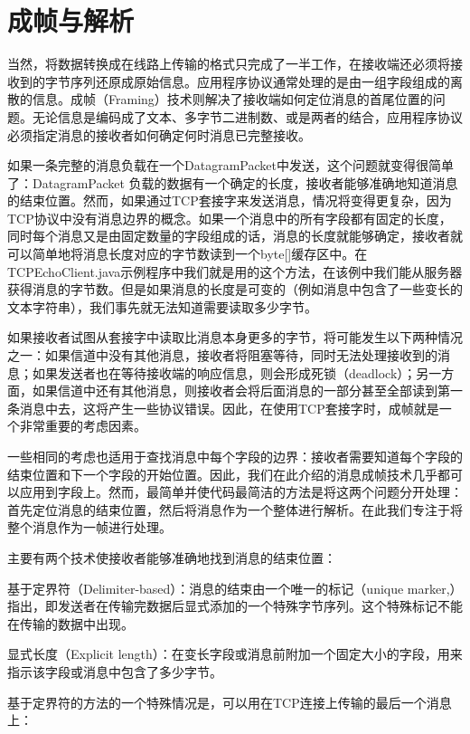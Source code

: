 \section{成帧与解析} 

	当然，将数据转换成在线路上传输的格式只完成了一半工作，在接收端还必须将接收到的字节序列还原成原始信息。应用程序协议通常处理的是由一组字段组成的离散的信息。成帧（Framing）技术则解决了接收端如何定位消息的首尾位置的问题。无论信息是编码成了文本、多字节二进制数、或是两者的结合，应用程序协议必须指定消息的接收者如何确定何时消息已完整接收。 

	如果一条完整的消息负载在一个DatagramPacket中发送，这个问题就变得很简单了：DatagramPacket 负载的数据有一个确定的长度，接收者能够准确地知道消息的结束位置。然而，如果通过TCP套接字来发送消息，情况将变得更复杂，因为TCP协议中没有消息边界的概念。如果一个消息中的所有字段都有固定的长度，同时每个消息又是由固定数量的字段组成的话，消息的长度就能够确定，接收者就可以简单地将消息长度对应的字节数读到一个byte[]缓存区中。在TCPEchoClient.java示例程序中我们就是用的这个方法，在该例中我们能从服务器获得消息的字节数。但是如果消息的长度是可变的（例如消息中包含了一些变长的文本字符串），我们事先就无法知道需要读取多少字节。 

	如果接收者试图从套接字中读取比消息本身更多的字节，将可能发生以下两种情况之一：如果信道中没有其他消息，接收者将阻塞等待，同时无法处理接收到的消息；如果发送者也在等待接收端的响应信息，则会形成死锁（deadlock）；另一方面，如果信道中还有其他消息，则接收者会将后面消息的一部分甚至全部读到第一条消息中去，这将产生一些协议错误。因此，在使用TCP套接字时，成帧就是一个非常重要的考虑因素。 

	一些相同的考虑也适用于查找消息中每个字段的边界：接收者需要知道每个字段的结束位置和下一个字段的开始位置。因此，我们在此介绍的消息成帧技术几乎都可以应用到字段上。然而，最简单并使代码最简洁的方法是将这两个问题分开处理：首先定位消息的结束位置，然后将消息作为一个整体进行解析。在此我们专注于将整个消息作为一帧进行处理。

	主要有两个技术使接收者能够准确地找到消息的结束位置： 

	基于定界符（Delimiter-based）：消息的结束由一个唯一的标记（unique marker,）指出，即发送者在传输完数据后显式添加的一个特殊字节序列。这个特殊标记不能在传输的数据中出现。 

	显式长度（Explicit length）：在变长字段或消息前附加一个固定大小的字段，用来指示该字段或消息中包含了多少字节。 

	基于定界符的方法的一个特殊情况是，可以用在TCP连接上传输的最后一个消息上：

